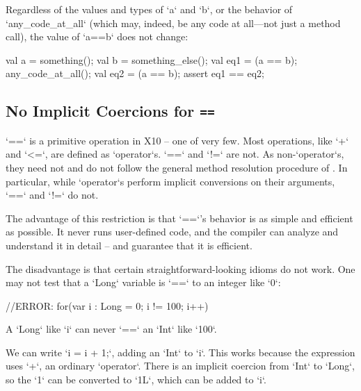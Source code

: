 \begin{ex}
Regardless of the values and types of \xcd`a` and \xcd`b`, 
or the behavior of \xcd`any_code_at_all` (which may, indeed, be
any code at all---not just a method call), the value of 
\xcd`a==b` does not change: 
\begin{xten}
val a = something();
val b = something_else();
val eq1 = (a == b);
any_code_at_all();
val eq2 = (a == b);
assert eq1 == eq2;
\end{xten}
\end{ex}



\subsection{No Implicit Coercions for {\tt ==}}
\label{sect:eqeq-no-coerce}

\xcd`==` is a primitive operation in X10 -- one of very few. Most operations,
like \xcd`+` and \xcd`<=`, are defined as \xcd`operator`s. \xcd`==` and
\xcd`!=` are not. As non-\xcd`operator`s, they need not and do not follow the
general method resolution procedure of . In
particular, while \xcd`operator`s perform implicit conversions on their
arguments, \xcd`==` and \xcd`!=` do not.

The advantage of this restriction is that \xcd`==`'s behavior is as simple and
efficient as possible.  It never runs user-defined code, and the compiler can
analyze and understand it in detail -- and guarantee that it is efficient.

The disadvantage is that certain straightforward-looking idioms do not work.
One may not test that a \xcd`Long` variable is \xcd`==` to an integer like
\xcd`0`: 
\begin{xten}
//ERROR: for(var i : Long = 0; i != 100; i++)  {}
\end{xten}





A \xcd`Long` like \xcd`i` can never \xcd`==` an \xcd`Int` like \xcd`100`.

We can write \xcd`i = i + 1;`, adding an \xcd`Int` to \xcd`i`. This works 
because the expression uses \xcd`+`,  an ordinary \xcd`operator`.
There is an implicit coercion from \xcd`Int` to \xcd`Long`, so the
\xcd`1` can be converted to \xcd`1L`, which can be added to \xcd`i`.  

